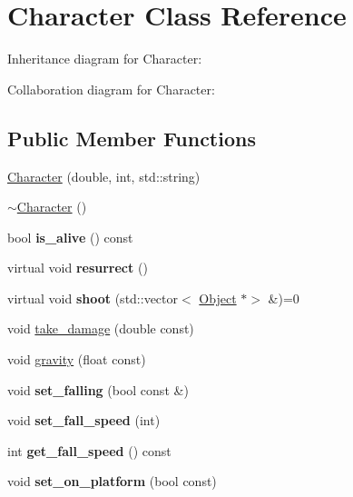 \hypertarget{classCharacter}{}\section{Character Class Reference}
\label{classCharacter}


Inheritance diagram for Character\+:


Collaboration diagram for Character\+:
\subsection*{Public Member Functions}
\begin{DoxyCompactItemize}
\item 
\hyperlink{classCharacter_af937c759ea30a7e387c31c23374dd5a6}{Character} (double, int, std\+::string)
\item 
\hyperlink{classCharacter_a9e9be564d05ded80962b2045aa70b3fc}{$\sim$\+Character} ()
\item 
\mbox{\label{classCharacter_a5c7b9245df1adca76494627b220efb42}} 
bool {\bfseries is\+\_\+alive} () const
\item 
\mbox{\label{classCharacter_ae2a0ee329e8839951010a2cd67faf1cd}} 
virtual void {\bfseries resurrect} ()
\item 
\mbox{\label{classCharacter_a9125a0d4c612c3a26c18809e345a6c29}} 
virtual void {\bfseries shoot} (std\+::vector$<$ \hyperlink{classObject}{Object} $\ast$$>$ \&)=0
\item 
void \hyperlink{classCharacter_acb5c904503c7e446ac508261946c530e}{take\+\_\+damage} (double const)
\item 
void \hyperlink{classCharacter_a34b7cd24b7f3ce54f2f99cf9b059a05d}{gravity} (float const)
\item 
\mbox{\label{classCharacter_ac7201d72eb24bc851af732579a906be2}} 
void {\bfseries set\+\_\+falling} (bool const \&)
\item 
\mbox{\label{classCharacter_a0b6a802d4087a061163a15d610e53a50}} 
void {\bfseries set\+\_\+fall\+\_\+speed} (int)
\item 
\mbox{\label{classCharacter_abb4eacf79f81ef71b2724338fbc5b6f6}} 
int {\bfseries get\+\_\+fall\+\_\+speed} () const
\item 
\mbox{\label{classCharacter_aa92749e9ab36972f63396f66829c6331}} 
void {\bfseries set\+\_\+on\+\_\+platform} (bool const)
\end{DoxyCompactItemize}
